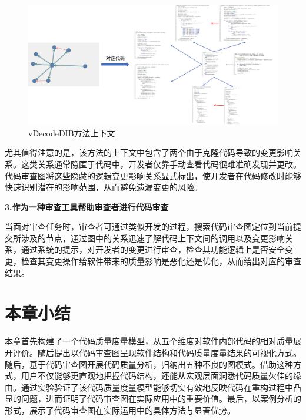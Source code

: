 \begin{figure}[h]
\centering
\includegraphics[width = 1\textwidth]{figures/3_助读示意.png}
\caption{vDecodeDIB方法上下文}
\end{figure}

尤其值得注意的是，该方法的上下文中包含了两个由于克隆代码导致的变更影响关系。这类关系通常隐匿于代码中，开发者仅靠手动查看代码很难准确发现并更改。代码审查图将这些隐藏的逻辑变更影响关系显式标出，使开发者在代码修改时能够快速识别潜在的影响范围，从而避免遗漏变更的风险。

\noindent \textbf{3.作为一种审查工具帮助审查者进行代码审查} 

当面对审查任务时，审查者可通过类似开发的过程，搜索代码审查图定位到当前提交所涉及的节点，通过图中的关系迅速了解代码上下文间的调用以及变更影响关系，通过系统的提示，对开发者的变更进行审查，检查其功能逻辑上是否安全变更，检查其变更操作给软件带来的质量影响是恶化还是优化，从而给出对应的审查结果。

\section{本章小结}

本章首先构建了一个代码质量度量模型，从五个维度对软件内部代码的相对质量展开评价。随后提出以代码审查图呈现软件结构和代码质量度量结果的可视化方式。随后，基于代码审查图开展代码质量分析，归纳出五种不良的图模式。借助这种方式，用户不仅能够更直观地把握代码结构，还能从宏观层面洞悉代码质量欠佳的缘由。通过实验验证了该代码质量度量模型能够切实有效地反映代码在重构过程中凸显的问题，进而证明了代码审查图在实际应用中的重要价值。最后，以案例分析的形式，展示了代码审查图在实际运用中的具体方法与显著优势。 
